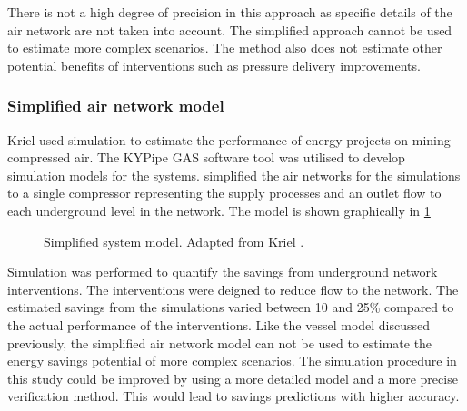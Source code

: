 There is not a high degree of precision in this approach as specific details of the air network are not taken into account. The simplified approach cannot be used to estimate more complex scenarios. The method also does not estimate other potential benefits of interventions such as pressure delivery improvements.

\subsubsection{Simplified air network model}
Kriel \cite{Kriel2014Masters} used simulation to estimate the performance of energy projects on mining compressed air. The KYPipe GAS software tool was utilised to develop simulation models for the systems. \cite{Kriel2014Masters} simplified the air networks for the simulations to a single compressor representing the supply processes and an outlet flow to each underground level in the network. The model is shown graphically in \cref{fig:kriel  model}
\begin{figure}[h!]
	\centering
	\caption[Simplified system model.]{Simplified system model. Adapted from Kriel \cite{Kriel2014Masters}.}
	\label{fig:kriel  model}
\end{figure}
\par 
Simulation was performed to quantify the savings from underground network interventions. The interventions were deigned to reduce flow to the network. The estimated savings from the simulations varied between 10 and 25\% compared to the actual performance of the interventions. Like the vessel model discussed previously, the simplified air network model can not be used to estimate the energy savings potential of more complex scenarios. The simulation procedure in this study could be improved by using a more detailed model and a more precise verification method. This would lead to savings predictions with higher accuracy. 

